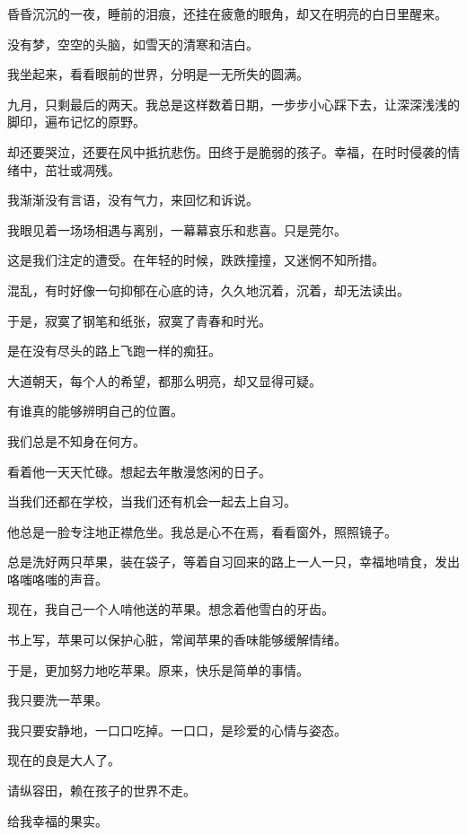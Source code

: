 
		昏昏沉沉的一夜，睡前的泪痕，还挂在疲惫的眼角，却又在明亮的白日里醒来。\par
		没有梦，空空的头脑，如雪天的清寒和洁白。\par
		我坐起来，看看眼前的世界，分明是一无所失的圆满。\par
		九月，只剩最后的两天。我总是这样数着日期，一步步小心踩下去，让深深浅浅的脚印，遍布记忆的原野。\par
		却还要哭泣，还要在风中抵抗悲伤。田终于是脆弱的孩子。幸福，在时时侵袭的情绪中，茁壮或凋残。\par
		我渐渐没有言语，没有气力，来回忆和诉说。\par
		我眼见着一场场相遇与离别，一幕幕哀乐和悲喜。只是莞尔。

		\vspace{1em}
		这是我们注定的遭受。在年轻的时候，跌跌撞撞，又迷惘不知所措。\par
		混乱，有时好像一句抑郁在心底的诗，久久地沉着，沉着，却无法读出。\par
		于是，寂寞了钢笔和纸张，寂寞了青春和时光。\par
		是在没有尽头的路上飞跑一样的痴狂。\par
		大道朝天，每个人的希望，都那么明亮，却又显得可疑。\par
		有谁真的能够辨明自己的位置。\par
		我们总是不知身在何方。



		看着他一天天忙碌。想起去年散漫悠闲的日子。\par
		当我们还都在学校，当我们还有机会一起去上自习。\par
		他总是一脸专注地正襟危坐。我总是心不在焉，看看窗外，照照镜子。\par
		总是洗好两只苹果，装在袋子，等着自习回来的路上一人一只，幸福地啃食，发出咯嗤咯嗤的声音。\par
		现在，我自己一个人啃他送的苹果。想念着他雪白的牙齿。

		\vspace{1em}
		书上写，苹果可以保护心脏，常闻苹果的香味能够缓解情绪。\par
		于是，更加努力地吃苹果。原来，快乐是简单的事情。\par
		我只要洗一苹果。\par
		我只要安静地，一口口吃掉。一口口，是珍爱的心情与姿态。

		\vspace{1em}
		现在的良是大人了。\par
		请纵容田，赖在孩子的世界不走。\par
		给我幸福的果实。


